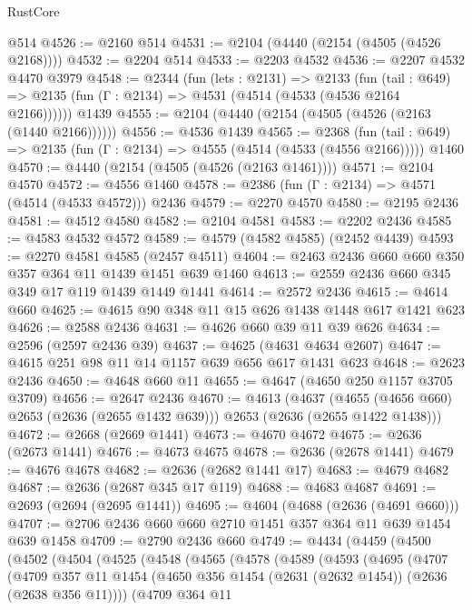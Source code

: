 \begin{lexlean}{RustCore}
\begin{coremodule}
    @514
@4526 := @2160 @514
@4531 := @2104 (@4440 (@2154 (@4505 (@4526 @2168))))
@4532 := @2204 @514
@4533 := @2203 @4532
@4536 := @2207 @4532 @4470 @3979
@4548 := @2344
    (fun (lets : @2131) =>
    @2133
      (fun (tail : @649) => @2135 (fun (Γ : @2134) => @4531 (@4514 (@4533 (@4536 @2164 @2166))))))
    @1439
@4555 := @2104 (@4440 (@2154 (@4505 (@4526 (@2163 (@1440 @2166))))))
@4556 := @4536 @1439
@4565 := @2368
    (fun (tail : @649) => @2135 (fun (Γ : @2134) => @4555 (@4514 (@4533 (@4556 @2166)))))
    @1460
@4570 := @4440 (@2154 (@4505 (@4526 (@2163 @1461))))
@4571 := @2104 @4570
@4572 := @4556 @1460
@4578 := @2386 (fun (Γ : @2134) => @4571 (@4514 (@4533 @4572))) @2436
@4579 := @2270 @4570
@4580 := @2195 @2436
@4581 := @4512 @4580
@4582 := @2104 @4581
@4583 := @2202 @2436
@4585 := @4583 @4532 @4572
@4589 := @4579 (@4582 @4585) (@2452 @4439)
@4593 := @2270 @4581 @4585 (@2457 @4511)
@4604 := @2463 @2436 @660 @660 @350 @357 @364 @11 @1439 @1451 @639 @1460
@4613 := @2559 @2436 @660 @345 @349 @17 @119 @1439 @1449 @1441
@4614 := @2572 @2436
@4615 := @4614 @660
@4625 := @4615 @90 @348 @11 @15 @626 @1438 @1448 @617 @1421 @623
@4626 := @2588 @2436
@4631 := @4626 @660 @39 @11 @39 @626
@4634 := @2596 (@2597 @2436 @39)
@4637 := @4625 (@4631 @4634 @2607)
@4647 := @4615 @251 @98 @11 @14 @1157 @639 @656 @617 @1431 @623
@4648 := @2623 @2436
@4650 := @4648 @660 @11
@4655 := @4647 (@4650 @250 @1157 @3705 @3709)
@4656 := @2647 @2436
@4670 := @4613
    (@4637 (@4655 (@4656 @660) @2653 (@2636 (@2655 @1432 @639))) @2653 (@2636 (@2655 @1422 @1438)))
@4672 := @2668 (@2669 @1441)
@4673 := @4670 @4672
@4675 := @2636 (@2673 @1441)
@4676 := @4673 @4675
@4678 := @2636 (@2678 @1441)
@4679 := @4676 @4678
@4682 := @2636 (@2682 @1441 @17)
@4683 := @4679 @4682
@4687 := @2636 (@2687 @345 @17 @119)
@4688 := @4683 @4687
@4691 := @2693 (@2694 (@2695 @1441))
@4695 := @4604 (@4688 (@2636 (@4691 @660)))
@4707 := @2706 @2436 @660 @660 @2710 @1451 @357 @364 @11 @639 @1454 @639 @1458
@4709 := @2790 @2436 @660
@4749 := @4434
    (@4459
      (@4500
        (@4502
          (@4504
            (@4525
              (@4548
                (@4565
                  (@4578
                    (@4589
                      (@4593
                        (@4695
                          (@4707
                            (@4709
                              @357
                              @11
                              @1454
                              (@4650 @356 @1454 (@2631 (@2632 @1454)) (@2636 (@2638 @356 @11))))
                            (@4709
                              @364
                              @11

\end{coremodule}
\end{lexlean}
